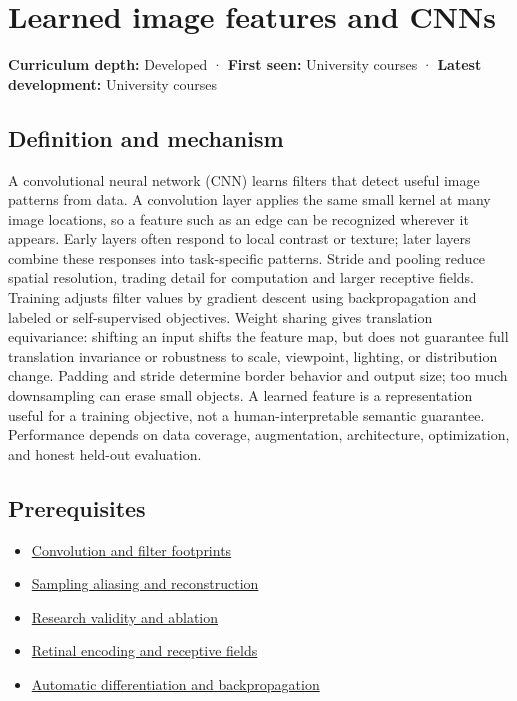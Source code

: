 \hypertarget{appendix-47c51ea026fb}{}\label{referencestart:appendix-47c51ea026fb}
\section{Learned image features and CNNs}\label{appendix-47c51ea026fb-learned-image-features-and-cnns}

\textbf{Curriculum depth:} Developed · \textbf{First seen:} University courses · \textbf{Latest development:} University courses

\subsection{Definition and mechanism}\label{appendix-47c51ea026fb-definition-and-mechanism}

A convolutional neural network (CNN) learns filters that detect useful image patterns from data. A convolution layer applies the same small kernel at many image locations, so a feature such as an edge can be recognized wherever it appears. Early layers often respond to local contrast or texture; later layers combine these responses into task-specific patterns. Stride and pooling reduce spatial resolution, trading detail for computation and larger receptive fields. Training adjusts filter values by gradient descent using backpropagation and labeled or self-supervised objectives. Weight sharing gives translation equivariance: shifting an input shifts the feature map, but does not guarantee full translation invariance or robustness to scale, viewpoint, lighting, or distribution change. Padding and stride determine border behavior and output size; too much downsampling can erase small objects. A learned feature is a representation useful for a training objective, not a human-interpretable semantic guarantee. Performance depends on data coverage, augmentation, architecture, optimization, and honest held-out evaluation.

\subsection{Prerequisites}\label{appendix-47c51ea026fb-prerequisites}

\begin{itemize}
\tightlist
\item
  \hyperref[appendix-d5b3c692d9f0]{Convolution and filter footprints}
\item
  \hyperref[appendix-6a7869dd79a6]{Sampling aliasing and reconstruction}
\item
  \hyperref[appendix-65788587ef78]{Research validity and ablation}
\item
  \hyperref[appendix-7281c15ac44a]{Retinal encoding and receptive fields}
\item
  \hyperref[appendix-40df0855b4a7]{Automatic differentiation and backpropagation}
\end{itemize}

